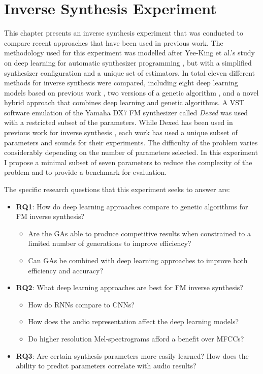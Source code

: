 \chapter{Inverse Synthesis Experiment}
\label{chapter:inverse_synth_experiment}

This chapter presents an inverse synthesis experiment that was conducted to compare recent approaches that have been used in previous work. The methodology used for this experiment was modelled after Yee-King et al.'s study on deep learning for automatic synthesizer programming \cite{yee2018automatic}, but with a simplified synthesizer configuration and a unique set of estimators. In total eleven different methods for inverse synthesis were compared, including eight deep learning models based on previous work \cite{barkan2019inversynth, yee2018automatic}, two versions of a genetic algorithm \cite{horner1993machine, tatar2016automatic}, and a novel hybrid approach that combines deep learning and genetic algorithms. A VST software emulation of the Yamaha DX7 FM synthesizer called \textit{Dexed} was used with a restricted subset of the parameters. While Dexed has been used in previous work for inverse synthesis \cite{yee2018automatic, luke2019stochastic, le2021improving, masudo2021quality}, each work has used a unique subset of parameters and sounds for their experiments. The difficulty of the problem varies considerably depending on the number of parameters selected. In this experiment I propose a minimal subset of seven parameters to reduce the complexity of the problem and to provide a benchmark for evaluation.

The specific research questions that this experiment seeks to answer are:
\begin{itemize}
    \item \textbf{RQ1}: How do deep learning approaches compare to genetic algorithms for FM inverse synthesis?
    \begin{itemize}
    	\item Are the GAs able to produce competitive results when constrained to a limited number of generations to improve efficiency?
    	\item Can GAs be combined with deep learning approaches to improve both efficiency and accuracy?
    \end{itemize}
    \item \textbf{RQ2}: What deep learning approaches are best for FM inverse synthesis?
    \begin{itemize}
    	\item How do RNNs compare to CNNs?
    	\item How does the audio representation affect the deep learning models?
    	\item Do higher resolution Mel-spectrograms afford a benefit over MFCCs?
    \end{itemize}
    \item \textbf{RQ3}: Are certain synthesis parameters more easily learned? How does the ability to predict parameters correlate with audio results?
\end{itemize}

